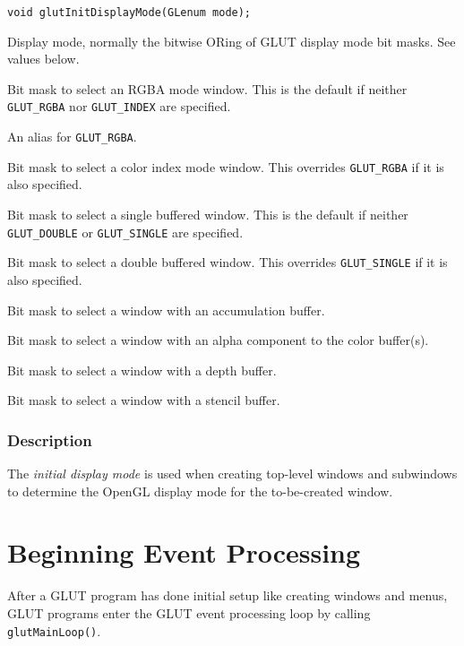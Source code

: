 \begin{verbatim}
void glutInitDisplayMode(GLenum mode);
\end{verbatim}
\begin{description}
\itemsep 0in
\item[\tt mode]
Display mode, normally the bitwise ORing of GLUT display mode bit masks.  See values
below.
\end{description}
\begin{description}
\itemsep 0in
\item[\tt GLUT\_RGBA]
Bit mask to select an RGBA mode window.  This is the default if neither {\tt GLUT\_RGBA}
nor {\tt GLUT\_INDEX} are specified.
\item[\tt GLUT\_RGB]
An alias for {\tt GLUT\_RGBA}.
\item[\tt GLUT\_INDEX]
Bit mask to select a color index mode window.  This overrides {\tt GLUT\_RGBA} if it is also
specified.
\item[\tt GLUT\_SINGLE]
Bit mask to select a single buffered window.  This is the default if neither {\tt GLUT\_DOUBLE}
or {\tt GLUT\_SINGLE} are specified.
\item[\tt GLUT\_DOUBLE]
Bit mask to select a double buffered window.  This overrides {\tt GLUT\_SINGLE} if it is also
specified.
\item[\tt GLUT\_ACCUM]
Bit mask to select a window with an accumulation buffer.
\item[\tt GLUT\_ALPHA]
Bit mask to select a window with an alpha component to the color buffer(s).
\item[\tt GLUT\_DEPTH]
Bit mask to select a window with a depth buffer.
\item[\tt GLUT\_STENCIL]
Bit mask to select a window with a stencil buffer.
\end{description}

\subsubsection*{Description}

The {\em initial display mode} is used when creating top-level windows and
subwindows to determine the OpenGL display mode for the to-be-created window.

\section{Beginning Event Processing}

After a GLUT program has done initial setup like creating windows and menus, GLUT
programs enter the GLUT event processing loop by calling {\tt glutMainLoop()}.


